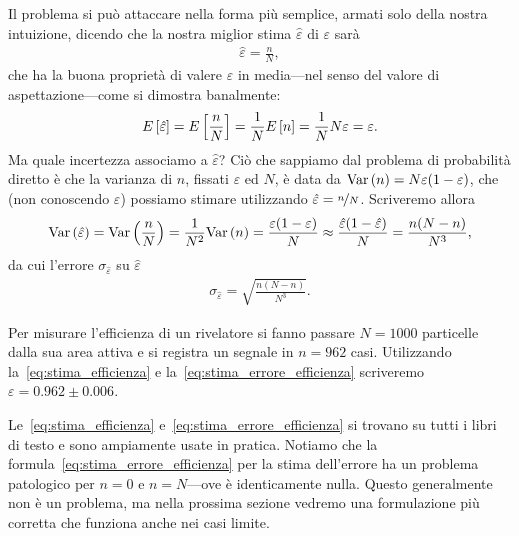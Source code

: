 Il problema si può attaccare nella forma più semplice, armati solo della
nostra intuizione, dicendo che la nostra miglior stima $\hat{\varepsilon}$ di
$\varepsilon$ sarà
\begin{align}\label{eq:stima_efficienza}
  \hat{\varepsilon} = \frac{n}{N},
\end{align}
che ha la buona proprietà di valere $\varepsilon$ in media---nel senso del
valore di aspettazione---come si dimostra banalmente:
\begin{align*}
  \displaystyle E\left[\hat\varepsilon\right] = \displaystyle E\left[\frac{n}{N}\right] = \frac{1}{N}\displaystyle E\left[n\right] =
  \frac{1}{N} N\varepsilon = \varepsilon.
\end{align*}
Ma quale incertezza associamo a $\hat\varepsilon$? Ciò che sappiamo dal
problema di probabilità diretto è che la varianza di $n$, fissati
$\varepsilon$ ed $N$, è data da $\text{Var}\left(n\right) = N\varepsilon(1 - \varepsilon)$,
che (non conoscendo $\varepsilon$) possiamo stimare utilizzando
$\hat\varepsilon = \nicefrac{n}{N}$.
Scriveremo allora
\begin{align*}
  \text{Var}\left(\hat\varepsilon\right) = \text{Var}\left(\frac{n}{N}\right) = \frac{1}{N^2}\text{Var}\left(n\right) =
  \frac{\varepsilon(1 - \varepsilon)}{N} \approx
  \frac{\hat\varepsilon(1 - \hat\varepsilon)}{N} = \frac{n(N - n)}{N^3},
\end{align*}
da cui l'errore $\sigma_{\hat\varepsilon}$ su $\hat\varepsilon$
\begin{align}\label{eq:stima_errore_efficienza}
  \sigma_{\hat\varepsilon} = \sqrt{\frac{n(N - n)}{N^3}}.
\end{align}

\begin{examplebox}
  \begin{example}
    Per misurare l'efficienza di un rivelatore si fanno passare $N = 1000$
    particelle dalla sua area attiva e si registra un segnale in
    $n = 962$ casi. Utilizzando la~\eqref{eq:stima_efficienza} e
    la~\eqref{eq:stima_errore_efficienza} scriveremo
    $\varepsilon = 0.962 \pm 0.006$.
  \end{example}
\end{examplebox}

Le~\eqref{eq:stima_efficienza} e~\eqref{eq:stima_errore_efficienza} si trovano
su tutti i libri di testo e sono ampiamente usate in pratica. Notiamo che la
formula~\eqref{eq:stima_errore_efficienza} per la stima dell'errore ha un
problema patologico per $n = 0$ e $n = N$---ove è identicamente nulla.
Questo generalmente non è un problema, ma nella prossima sezione vedremo
una formulazione più corretta che funziona anche nei casi limite.


